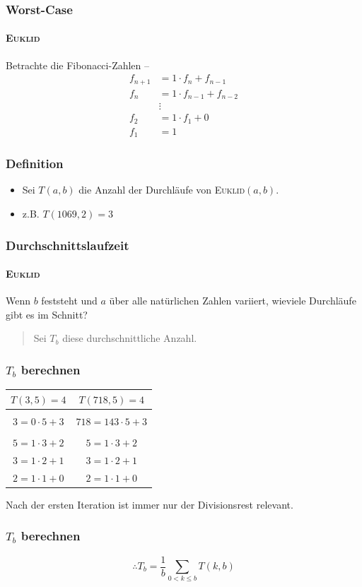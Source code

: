 \documentclass[•]{beamer}
\begin{document}
	\begin{frame}
	\frametitle{Worst-Case}
	\framesubtitle{\textsc{Euklid}}
\pause
	Betrachte die Fibonacci-Zahlen --
	\begin{align*}
 f_{n+1} &= 1 \cdot f_{n} + f_{n-1} \\
 f_{n} &= 1 \cdot f_{n-1} + f_{n-2} \\
 &\vdots \\
 f_{2} &= 1 \cdot f_{1} + 0 \\
 f_{1} &= 1
\end{align*}
\end{frame}	
\begin{frame}
\frametitle{Definition}
\pause
\begin{itemize}
	\item Sei $T(a,b)$ die Anzahl der Durchl\"aufe von \textsc{Euklid}$(a,b)$.
	\pause
	\item z.B. $T(1069,2) = 3$
\end{itemize}

\end{frame}
\begin{frame}
	\frametitle{Durchschnittslaufzeit}
	\framesubtitle{\textsc{Euklid}}
	\pause
	Wenn $b$ feststeht und $a$ \"uber alle nat\"urlichen Zahlen variiert, wieviele Durchl\"aufe gibt es im Schnitt?\vspace{10pt}
	\pause
	\begin{quote}
	Sei $T_{b}$ diese durchschnittliche Anzahl.
	\end{quote}
	\end{frame}
\begin{frame}
\frametitle{$T_b$ berechnen}
 \begin{center}
 \begin{tabular}{|c|c|} \hline
 $T(3,5) = 4$ & $T(718,5) = 4$  \\ \hline
 	& \\
	$3=0\cdot 5 + 3$ & $718=143\cdot 5 + 3$ \\
	& \\
	$5=1\cdot 3 + 2$ & $5=1\cdot 3 + 2$ \\
	$3=1\cdot 2 + 1$ & $3=1\cdot 2 + 1$ \\
	$2=1\cdot 1 + 0$ & $2=1\cdot 1 + 0$ \\ \hline
	 \end{tabular}
	  \end{center}
	  \pause
	   Nach der ersten Iteration ist immer nur der Divisionsrest relevant.
\end{frame}
\begin{frame}
\frametitle{$T_b$ berechnen}
	$$\therefore T_{b} = \frac{1}{b} \sum_{0 < k\leq b} T(k,b)$$
	\end{frame}
\end{document}
